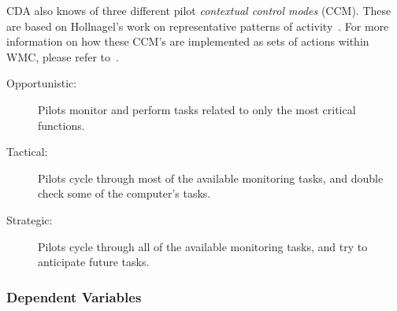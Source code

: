 \documentclass[journal]{IEEEtran}
\newcommand{\be}{\begin{enumerate}}
\newcommand{\ee}{\end{enumerate}}
\begin{document}
CDA also knows of three different pilot {\em contextual control modes} (CCM).  These are based on Hollnagel's work on representative patterns of activity~\cite{Hollnagel1993}. For more information on how these CCM's are implemented as sets of actions within WMC, please refer to~\cite{Feigh2014}.
\begin{description}
    \item[Opportunistic:]  Pilots monitor and perform tasks related to only the most critical functions.
    \item[Tactical:] Pilots cycle through most of the available monitoring tasks, and double check some of the computer's tasks.
    \item[Strategic:] Pilots cycle through all of the available monitoring tasks, and try to anticipate future tasks.
\end{description} 


\subsubsection{Dependent Variables}
\end{document}
